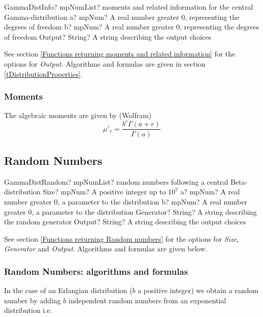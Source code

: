 \begin{mpFunctionsExtract}
	\mpFunctionTwoNotImplemented
	{GammaDistInfo? mpNumList? moments and related information for the central Gamma-distribution}
	{a? mpNum? A real number greater 0, representing the degrees of freedom}
	{b? mpNum? A real number greater 0, representing the degrees of freedom}
	{Output? String? A string describing the output choices}
\end{mpFunctionsExtract}

\vspace{0.3cm}

See section \ref{Functions returning moments and related information} for the options for {\itshape\sffamily Output}. Algorithms and formulas are given in section \ref{tDistributionProperties}.



\subsubsection{Moments}
The algebraic moments are given by (Wolfram)
\begin{equation} 
	\mu'_r = \frac{b^r \Gamma(a+r)}{\Gamma(a)}
\end{equation}




\subsection{Random Numbers}

\begin{mpFunctionsExtract}
	\mpFunctionFiveNotImplemented
	{GammaDistRandom? mpNumList? random numbers following a central Beta-distribution}
	{Size? mpNum? A positive integer up to $10^7$}
	{a? mpNum? A real number greater 0, a parameter to the distribution}
	{b? mpNum? A real number greater 0, a parameter to the distribution}
	{Generator? String? A string describing the random generator}
	{Output? String? A string describing the output choices}
\end{mpFunctionsExtract}

\vspace{0.3cm}

See section \ref{Functions returning Random numbers} for the options for  {\itshape\sffamily Size},  {\itshape\sffamily Generator} and {\itshape\sffamily Output}. Algorithms and formulas are given below.



\subsubsection{Random Numbers: algorithms and formulas}
In the case of an Erlangian distribution ($b$ a positive integer) we obtain a random number
by adding $b$ independent random numbers from an exponential distribution i.e.

